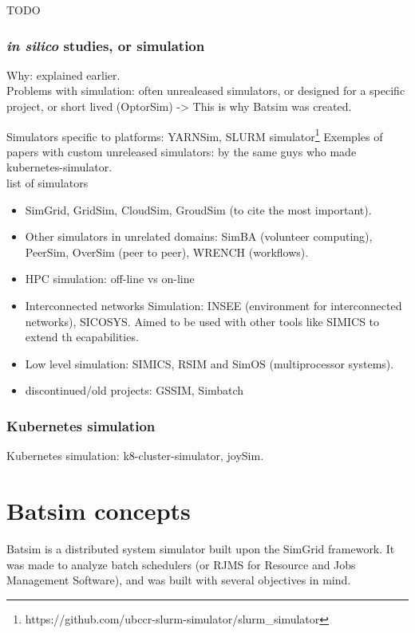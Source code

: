 \documentclass[12pt, a4paper]{memoir}
\begin{document}
TODO

\subsubsection{\textit{in silico} studies, or simulation}

Why: explained earlier.\\

Problems with simulation: often unrealeased simulators, or designed for a specific project, or short lived (OptorSim) -> This is why Batsim was created.

Simulators specific to platforms: YARNSim, SLURM simulator\footnote{https://github.com/ubccr-slurm-simulator/slurm\_simulator} 
Exemples of papers with custom unreleased simulators: \cite{yabuuchi2019lowlatency} by the same guys who made kubernetes-simulator.\\

list of simulators
\begin{itemize}
	\item SimGrid, GridSim, CloudSim, GroudSim (to cite the most important).
	\item Other simulators in unrelated domains: SimBA (volunteer computing), PeerSim, OverSim (peer to peer), WRENCH (workflows).
	\item HPC simulation: off-line vs on-line
	\item Interconnected networks Simulation: INSEE (environment for interconnected networks), SICOSYS. Aimed to be used with other tools like SIMICS to extend th ecapabilities.
	\item Low level simulation: SIMICS, RSIM and SimOS (multiprocessor systems).
	\item discontinued/old projects: GSSIM, Simbatch
\end{itemize}

\subsubsection{Kubernetes simulation}

Kubernetes simulation: k8-cluster-simulator, joySim.

\section{Batsim concepts}

Batsim\cite{dutot:hal-01333471} is a distributed system simulator built upon
the SimGrid framework. It was made to analyze batch schedulers (or RJMS for
Resource and Jobs Management Software), and was built with several objectives in
mind.
\end{document}
